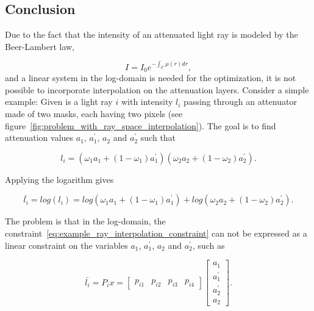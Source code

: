 \documentclass[11pt,a4paper,titlepage]{article}
\begin{document}
\subsection{Conclusion}

Due to the fact that the intensity of an attenuated light ray is modeled by the Beer-Lambert law, 

\begin{equation}
	I = I_0 e^{-\int_{\mathcal{C}}\mu\left(r\right)dr}, 
\end{equation}
and a linear system in the log-domain is needed for the optimization, it is not possible to incorporate interpolation on the attenuation layers. Consider a simple example: Given is a light ray $i$ with intensity $l_i$ passing through an attenuator made of two masks, each having two pixels (see figure~\ref{fig:problem_with_ray_space_interpolation}). The goal is to find attenuation values $a_1$, $a_1^\prime$, $a_2$ and $a_2^\prime$ such that

\begin{equation}
	l_i = \left(\omega_1 a_1 + \left(1 - \omega_1\right) a_1^{\prime}\right) \left(\omega_2 a_2 + \left(1 - \omega_2\right) a_2^{\prime} \right).
\end{equation}

Applying the logarithm gives

\begin{equation}\label{eq:example_ray_interpolation_constraint}
	\bar{l_i} = log\left(l_i\right) = log\left(\omega_1 a_1 + \left(1 - \omega_1\right) a_1^{\prime}\right) + log\left(\omega_2 a_2 + \left(1 - \omega_2\right) a_2^{\prime} \right).
\end{equation}

The problem is that in the log-domain, the constraint~\ref{eq:example_ray_interpolation_constraint} can not be expressed as a linear constraint on the variables $a_1$, $a_1^\prime$, $a_2$ and $a_2^\prime$, such as

\begin{equation}
	\bar{l_i} = P_i x = 
	\begin{bmatrix}
		p_{i1} & p_{i2} & p_{i3} & p_{i4}
	\end{bmatrix}
	\begin{bmatrix}
		a_1 \\ a_1^{\prime} \\ a_2^{\prime} \\ a_2
	\end{bmatrix}.
\end{equation}
\end{document}
